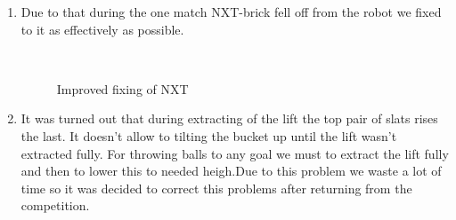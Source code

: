 \begin{enumerate}
	\item Due to that during the one match NXT-brick fell off from the robot we fixed to it as effectively as possible.
	
	\begin{figure}[H]
		\begin{minipage}[h]{0.2\linewidth}
			\center  
		\end{minipage}
		\begin{minipage}[h]{0.6\linewidth}
			\caption{Improved fixing of NXT}
		\end{minipage}
	\end{figure}
	
	\item It was turned out that during extracting of the lift the top pair of slats rises the last. It doesn't allow to tilting the bucket up until the lift wasn't extracted fully. For throwing balls to any goal we must to extract the lift fully and then to lower this to needed heigh.Due to this problem we waste a lot of time so it was decided to correct this problems after returning from the competition.
	
\end{enumerate}
\fillpage